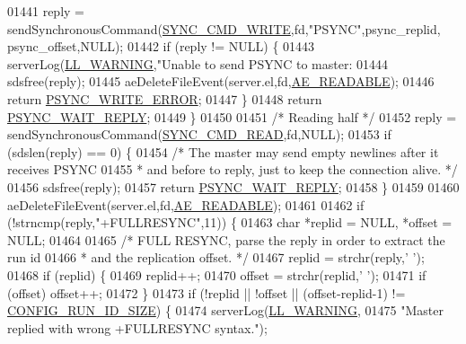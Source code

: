 \begin{DoxyCode}
{{{{{{{{{{{{{{{{{{{{{{{{{{{{{{{{{{{{{{{{{{{{{{{{{{{{01441         reply = sendSynchronousCommand(\hyperlink{replication_8c_aa4480c458f209657b59d476157d44aab}{SYNC\_CMD\_WRITE},fd,\textcolor{stringliteral}{"PSYNC"},psync\_replid,
      psync\_offset,NULL);
01442         \textcolor{keywordflow}{if} (reply != NULL) \{
01443             serverLog(\hyperlink{server_8h_a31229b9334bba7d6be2a72970967a14b}{LL\_WARNING},\textcolor{stringliteral}{"Unable to send PSYNC to master: %
01444             sdsfree(reply);
01445             aeDeleteFileEvent(server.el,fd,\hyperlink{ae_8h_a7a9a2162d007d09739955b4e55c65bf3}{AE\_READABLE});
01446             \textcolor{keywordflow}{return} \hyperlink{replication_8c_a63479df7aec0103920c029d735f6b4ba}{PSYNC\_WRITE\_ERROR};
01447         \}
01448         \textcolor{keywordflow}{return} \hyperlink{replication_8c_a4308c1e1292e0c34cf84d6e54b4869aa}{PSYNC\_WAIT\_REPLY};
01449     \}
01450 
01451     \textcolor{comment}{/* Reading half */}
01452     reply = sendSynchronousCommand(\hyperlink{replication_8c_a5dde0948d622fc1b0327b0d49cb3cef5}{SYNC\_CMD\_READ},fd,NULL);
01453     \textcolor{keywordflow}{if} (sdslen(reply) == 0) \{
01454         \textcolor{comment}{/* The master may send empty newlines after it receives PSYNC}
01455 \textcolor{comment}{         * and before to reply, just to keep the connection alive. */}
01456         sdsfree(reply);
01457         \textcolor{keywordflow}{return} \hyperlink{replication_8c_a4308c1e1292e0c34cf84d6e54b4869aa}{PSYNC\_WAIT\_REPLY};
01458     \}
01459 
01460     aeDeleteFileEvent(server.el,fd,\hyperlink{ae_8h_a7a9a2162d007d09739955b4e55c65bf3}{AE\_READABLE});
01461 
01462     \textcolor{keywordflow}{if} (!strncmp(reply,\textcolor{stringliteral}{"+FULLRESYNC"},11)) \{
01463         \textcolor{keywordtype}{char} *replid = NULL, *offset = NULL;
01464 
01465         \textcolor{comment}{/* FULL RESYNC, parse the reply in order to extract the run id}
01466 \textcolor{comment}{         * and the replication offset. */}
01467         replid = strchr(reply,\textcolor{stringliteral}{' '});
01468         \textcolor{keywordflow}{if} (replid) \{
01469             replid++;
01470             offset = strchr(replid,\textcolor{stringliteral}{' '});
01471             \textcolor{keywordflow}{if} (offset) offset++;
01472         \}
01473         \textcolor{keywordflow}{if} (!replid || !offset || (offset-replid-1) != \hyperlink{server_8h_aba6794fa3ee28f85165eaed93190f1df}{CONFIG\_RUN\_ID\_SIZE}) \{
01474             serverLog(\hyperlink{server_8h_a31229b9334bba7d6be2a72970967a14b}{LL\_WARNING},
01475                 \textcolor{stringliteral}{"Master replied with wrong +FULLRESYNC syntax."});
}}}}}}}}}}}}}}}}}}}}}}}}}}}}}}}}}}}}}}}}}}}}}}}}}}}}}
\end{DoxyCode}
